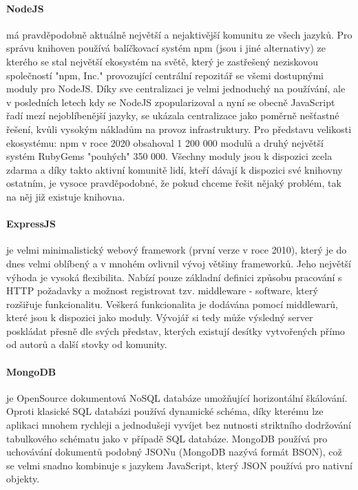 \paragraph{NodeJS} má pravděpodobně aktuálně největší a nejaktivější komunitu ze všech jazyků. Pro správu knihoven používá balíčkovací systém npm (jsou i jiné alternativy) ze kterého se stal největší ekosystém na světě, který je zastřešený neziskovou společností "npm, Inc." provozující centrální repozitář se všemi dostupnými moduly pro NodeJS. Díky sve centralizaci je velmi jednoduchý na používání, ale v posledních letech kdy se NodeJS zpopularizoval a nyní se obecně JavaScript řadí mezí nejoblíbenější jazyky, se ukázala centralizace jako poměrně nešťastné řešení, kvůli vysokým nákladům na provoz infrastruktury. Pro představu velikosti ekosystému: npm v roce 2020 obsahoval 1 200 000 modulů a druhý největší systém RubyGems "pouhých" 350 000. Všechny moduly jsou k dispozici zcela zdarma a díky takto aktivní komunitě lidí, kteří dávají k dispozici své knihovny ostatním, je vysoce pravděpodobné, že pokud chceme řešit nějaký problém, tak na něj již existuje knihovna.

\paragraph{ExpressJS} je velmi minimalistický webový framework (první verze v roce 2010), který je do dnes velmi oblíbený a v mnohém ovlivnil vývoj většiny frameworků. Jeho největší výhoda je vysoká flexibilita. Nabízí pouze základní definici způsobu pracování s HTTP požadavky a možnost registrovat tzv. middleware - software, který rozšiřuje funkcionalitu. Veškerá funkcionalita je dodávána pomocí middlewarů, které jsou k dispozici jako moduly. Vývojář si tedy může výsledný server poskládat přesně dle svých představ, kterých existují desítky vytvořených přímo od autorů a další stovky od komunity.

\paragraph{MongoDB} je OpenSource dokumentová NoSQL databáze umožňující horizontální škálování. Oproti klasické SQL databázi používá dynamické schéma, díky kterému lze aplikaci mnohem rychleji a jednodušeji vyvíjet bez nutnosti striktního dodržování tabulkového schématu jako v případě SQL databáze. MongoDB používá pro uchovávání dokumentů podobný JSONu (MongoDB nazývá formát BSON), což se velmi snadno kombinuje s jazykem JavaScript, který JSON používá pro nativní objekty.

